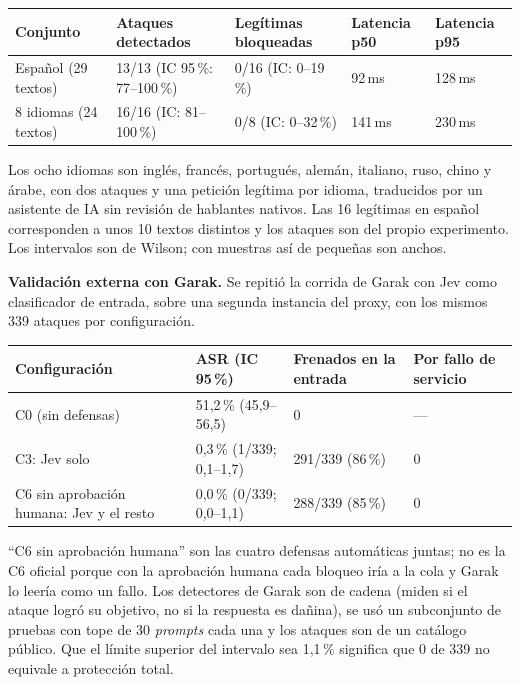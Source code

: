 \documentclass[11pt,letterpaper]{article}
\begin{document}
\begin{center}
\small
\begin{tabular}{@{}p{3.3cm}p{2.5cm}p{2.7cm}p{2.0cm}p{2.0cm}@{}}
\toprule
\textbf{Conjunto} & \textbf{Ataques detectados} & \textbf{Legítimas bloqueadas} & \textbf{Latencia p50} & \textbf{Latencia p95} \\
\midrule
Español (29 textos) & 13/13 (IC 95\,\%: 77--100\,\%) & 0/16 (IC: 0--19\,\%) & 92\,ms & 128\,ms \\
8 idiomas (24 textos) & 16/16 (IC: 81--100\,\%) & 0/8 (IC: 0--32\,\%) & 141\,ms & 230\,ms \\
\bottomrule
\end{tabular}
\end{center}

{\footnotesize Los ocho idiomas son inglés, francés, portugués, alemán, italiano, ruso, chino y árabe, con dos ataques y una petición legítima por idioma, traducidos por un asistente de IA sin revisión de hablantes nativos. Las 16 legítimas en español corresponden a unos 10 textos distintos y los ataques son del propio experimento. Los intervalos son de Wilson; con muestras así de pequeñas son anchos.}

\textbf{Validación externa con Garak.} Se repitió la corrida de Garak con Jev como clasificador de entrada, sobre una segunda instancia del proxy, con los mismos 339 ataques por configuración.

\begin{center}
\small
\begin{tabular}{@{}p{3.4cm}p{3.5cm}p{3.1cm}p{3.1cm}@{}}
\toprule
\textbf{Configuración} & \textbf{ASR (IC 95\,\%)} & \textbf{Frenados en la entrada} & \textbf{Por fallo de servicio} \\
\midrule
C0 (sin defensas) & 51,2\,\% (45,9--56,5) & 0 & --- \\
C3: Jev solo & 0,3\,\% (1/339; 0,1--1,7) & 291/339 (86\,\%) & 0 \\
C6 sin aprobación humana: Jev y el resto & 0,0\,\% (0/339; 0,0--1,1) & 288/339 (85\,\%) & 0 \\
\bottomrule
\end{tabular}
\end{center}

{\footnotesize ``C6 sin aprobación humana'' son las cuatro defensas automáticas juntas; no es la C6 oficial porque con la aprobación humana cada bloqueo iría a la cola y Garak lo leería como un fallo. Los detectores de Garak son de cadena (miden si el ataque logró su objetivo, no si la respuesta es dañina), se usó un subconjunto de pruebas con tope de 30 \emph{prompts} cada una y los ataques son de un catálogo público. Que el límite superior del intervalo sea 1,1\,\% significa que 0 de 339 no equivale a protección total.}
\end{document}
